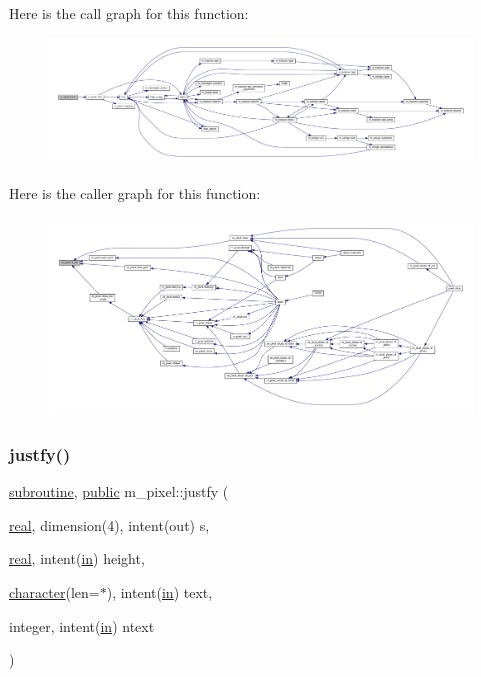 Here is the call graph for this function\+:
\nopagebreak
\begin{figure}[H]
\begin{center}
\leavevmode
\includegraphics[width=350pt]{namespacem__pixel_a6c23c2779e54da4ac7505cfb816cc2b1_cgraph}
\end{center}
\end{figure}
Here is the caller graph for this function\+:
\nopagebreak
\begin{figure}[H]
\begin{center}
\leavevmode
\includegraphics[width=350pt]{namespacem__pixel_a6c23c2779e54da4ac7505cfb816cc2b1_icgraph}
\end{center}
\end{figure}
\mbox{\label{namespacem__pixel_a7b08886c913b47694edeb60fa747afc4}} 
\subsubsection{\texorpdfstring{justfy()}{justfy()}}
{\footnotesize\ttfamily \hyperlink{M__stopwatch_83_8txt_acfbcff50169d691ff02d4a123ed70482}{subroutine}, \hyperlink{M__stopwatch_83_8txt_a2f74811300c361e53b430611a7d1769f}{public} m\+\_\+pixel\+::justfy (\begin{DoxyParamCaption}\item[{\hyperlink{read__watch_83_8txt_abdb62bde002f38ef75f810d3a905a823}{real}, dimension(4), intent(out)}]{s,  }\item[{\hyperlink{read__watch_83_8txt_abdb62bde002f38ef75f810d3a905a823}{real}, intent(\hyperlink{M__journal_83_8txt_afce72651d1eed785a2132bee863b2f38}{in})}]{height,  }\item[{\hyperlink{option__stopwatch_83_8txt_abd4b21fbbd175834027b5224bfe97e66}{character}(len=$\ast$), intent(\hyperlink{M__journal_83_8txt_afce72651d1eed785a2132bee863b2f38}{in})}]{text,  }\item[{integer, intent(\hyperlink{M__journal_83_8txt_afce72651d1eed785a2132bee863b2f38}{in})}]{ntext }\end{DoxyParamCaption})}



